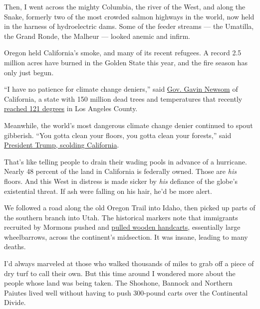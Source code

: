Then, I went across the mighty Columbia, the river of the West, and
along the Snake, formerly two of the most crowded salmon highways in the
world, now held in the harness of hydroelectric dams. Some of the feeder
streams --- the Umatilla, the Grand Ronde, the Malheur --- looked anemic
and infirm.

Oregon held California's smoke, and many of its recent refugees. A
record 2.5 million acres have burned in the Golden State this year, and
the fire season has only just begun.

``I have no patience for climate change deniers,'' said
\href{https://www.theguardian.com/world/video/2020/sep/09/california-governor-wildfires-no-patience-climate-change-deniers-video}{Gov.
Gavin Newsom} of California, a state with 150 million dead trees and
temperatures that recently
\href{https://www.latimes.com/california/story/2020-09-06/southern-california-weather-forecast-sunday-los-angeles-record-breaking-heat}{reached
121 degrees} in Los Angeles County.

Meanwhile, the world's most dangerous climate change denier continued to
spout gibberish. ``You gotta clean your floors, you gotta clean your
forests,'' said
\href{https://www.politico.com/states/california/story/2020/08/20/trump-blames-california-for-wildfires-tells-state-you-gotta-clean-your-floors-1311059}{President
Trump, scolding California}.

That's like telling people to drain their wading pools in advance of a
hurricane. Nearly 48 percent of the land in California is federally
owned. Those are \emph{his} floors. And this West in distress is made
sicker by \emph{his} defiance of the globe's existential threat. If ash
were falling on his hair, he'd be more alert.

We followed a road along the old Oregon Trail into Idaho, then picked up
parts of the southern branch into Utah. The historical markers note that
immigrants recruited by Mormons pushed and
\href{https://www.wyohistory.org/encyclopedia/journey-martins-cove-mormon-handcart-tragedy-1856}{pulled
wooden handcarts}, essentially large wheelbarrows, across the
continent's midsection. It was insane, leading to many deaths.

I'd always marveled at those who walked thousands of miles to grab off a
piece of dry turf to call their own. But this time around I wondered
more about the people whose land was being taken. The Shoshone, Bannock
and Northern Paiutes lived well without having to push 300-pound carts
over the Continental Divide.

